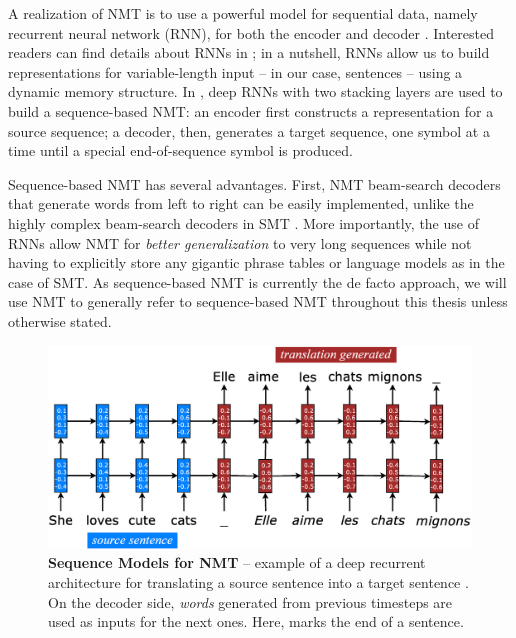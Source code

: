 {A realization of NMT is to use a powerful model for sequential data, namely recurrent
neural network (RNN), for both the encoder and decoder \cite{sutskever14,cho14}.
Interested readers can find details about RNNs in
; in a nutshell, RNNs allow us to build representations for
variable-length input -- in our case, sentences -- using a dynamic memory
structure. In , deep RNNs with two stacking layers are used to build
a sequence-based NMT: an encoder first constructs a representation for a source
sequence; a decoder, then, generates a target sequence,
one symbol at a time until a special end-of-sequence symbol is produced.

Sequence-based NMT has several advantages.
First, NMT beam-search decoders that generate words from left to right can be
easily implemented, unlike the highly complex beam-search decoders in SMT
\cite{Koehn:2003:SMT}. More importantly, the use of
RNNs allow NMT for {\it better generalization} to very long
sequences while not having to  explicitly store any gigantic
phrase tables or language models as in the case of SMT.
As sequence-based NMT is currently the de facto approach, we will use NMT to
generally refer to sequence-based NMT
throughout this thesis unless otherwise stated.

\begin{figure}[tbh!]
\centering
\includegraphics[width=\textwidth, clip=true, trim= 0 0 0
0]{img/nmt_intro} %
\caption[Sequence Models for NMT]{{\bf Sequence Models for NMT} -- example of a
deep recurrent architecture for translating a source sentence  into a target sentence . On the
decoder side, {\it words} generated from previous timesteps are used as inputs for the
next ones. Here, \word{\texttt{\_}} marks the end of a sentence.
} 
\label{f:nmt}
\end{figure}



}



